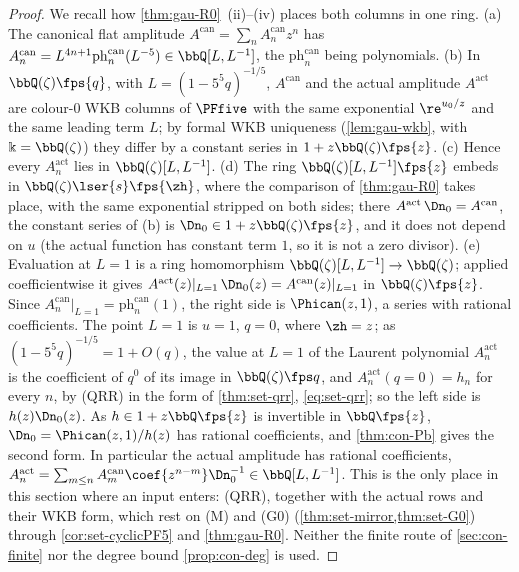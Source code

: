 \begin{proof}
We recall how \cref{thm:gau-R0}~(ii)--(iv) places both columns in one ring. (a) The canonical flat amplitude $A^{\mathrm{can}}=\sum_nA^{\mathrm{can}}_nz^n$ has $A^{\mathrm{can}}_n=L^{4n+1}\mathrm{ph}^{\mathrm{can}}_n(L^{-5})\in\bbQ[L,L^{-1}]$, the $\mathrm{ph}^{\mathrm{can}}_n$ being polynomials. (b) In $\bbQ(\zeta)\fps{q}$, with $L=(1-5^5q)^{-1/5}$, $A^{\mathrm{can}}$ and the actual amplitude $A^{\mathrm{act}}$ are colour-$0$ WKB columns of $\PFfive$ with the same exponential $\re^{u_0/z}$ and the same leading term $L$; by formal WKB uniqueness (\cref{lem:gau-wkb}, with $\Bbbk=\bbQ(\zeta)$) they differ by a constant series in $1+z\bbQ(\zeta)\fps{z}$. (c) Hence every $A^{\mathrm{act}}_n$ lies in $\bbQ(\zeta)[L,L^{-1}]$. (d) The ring $\bbQ(\zeta)[L,L^{-1}]\fps{z}$ embeds in $\bbQ(\zeta)\lser{s}\fps{\zh}$, where the comparison of \cref{thm:gau-R0} takes place, with the same exponential stripped on both sides; there $A^{\mathrm{act}}\,\Dn_0=A^{\mathrm{can}}$, the constant series of (b) is $\Dn_0\in1+z\bbQ(\zeta)\fps{z}$, and it does not depend on $u$ (the actual function has constant term $1$, so it is not a zero divisor). (e) Evaluation at $L=1$ is a ring homomorphism $\bbQ(\zeta)[L,L^{-1}]\to\bbQ(\zeta)$; applied coefficientwise it gives $A^{\mathrm{act}}(z)|_{L=1}\,\Dn_0(z)=A^{\mathrm{can}}(z)|_{L=1}$ in $\bbQ(\zeta)\fps{z}$. Since $A^{\mathrm{can}}_n|_{L=1}=\mathrm{ph}^{\mathrm{can}}_n(1)$, the right side is $\Phican(z,1)$, a series with rational coefficients. The point $L=1$ is $u=1$, $q=0$, where $\zh=z$; as $(1-5^5q)^{-1/5}=1+O(q)$, the value at $L=1$ of the Laurent polynomial $A^{\mathrm{act}}_n$ is the coefficient of $q^0$ of its image in $\bbQ(\zeta)\fps q$, and $A^{\mathrm{act}}_n(q=0)=h_n$ for every $n$, by (QRR) in the form of \cref{thm:set-qrr}, \eqref{eq:set-qrr}; so the left side is $h(z)\Dn_0(z)$. As $h\in1+z\bbQ\fps{z}$ is invertible in $\bbQ\fps{z}$, $\Dn_0=\Phican(z,1)/h(z)$ has rational coefficients, and \cref{thm:con-Pb} gives the second form. In particular the actual amplitude has rational coefficients, $A^{\mathrm{act}}_n=\sum_{m\leq n}A^{\mathrm{can}}_m\coef{z^{n-m}}\Dn_0^{-1}\in\bbQ[L,L^{-1}]$. This is the only place in this section where an input enters: (QRR), together with the actual rows and their WKB form, which rest on (M) and (G0) (\cref{thm:set-mirror,thm:set-G0}) through \cref{cor:set-cyclicPF5} and \cref{thm:gau-R0}. Neither the finite route of \cref{sec:con-finite} nor the degree bound \cref{prop:con-deg} is used.
\end{proof}

